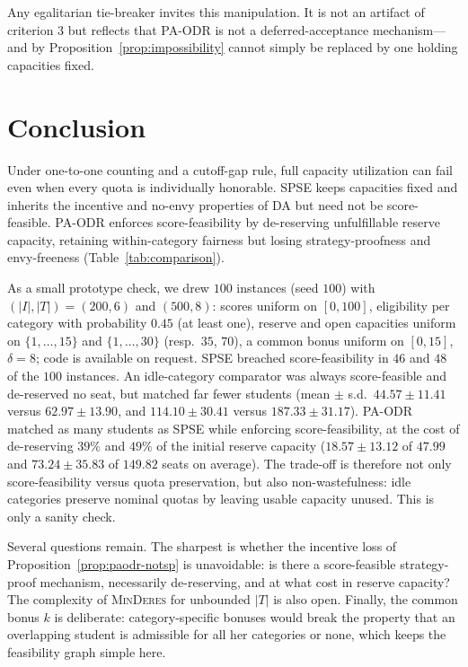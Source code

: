 \documentclass[runningheads]{llncs}
\begin{document}
Any egalitarian tie-breaker invites this manipulation. It is not an artifact of criterion 3 but reflects that PA-ODR is not a deferred-acceptance mechanism---and by Proposition~\ref{prop:impossibility} cannot simply be replaced by one holding capacities fixed.

\section{Conclusion}

Under one-to-one counting and a cutoff-gap rule, full capacity utilization can fail even when every quota is individually honorable. SPSE keeps capacities fixed and inherits the incentive and no-envy properties of DA but need not be score-feasible. PA-ODR enforces score-feasibility by de-reserving unfulfillable reserve capacity, retaining within-category fairness but losing strategy-proofness and envy-freeness (Table~\ref{tab:comparison}).

As a small prototype check, we drew $100$ instances (seed $100$) with $(|I|,|T|)=(200,6)$ and $(500,8)$: scores uniform on $[0,100]$, eligibility per category with probability $0.45$ (at least one), reserve and open capacities uniform on $\{1,\dots,15\}$ and $\{1,\dots,30\}$ (resp.\ $35$, $70$), a common bonus uniform on $[0,15]$, $\delta=8$; code is available on request. SPSE breached score-feasibility in $46$ and $48$ of the $100$ instances. An idle-category comparator was always score-feasible and de-reserved no seat, but matched far fewer students (mean $\pm$ s.d.\ $44.57\pm11.41$ versus $62.97\pm13.90$, and $114.10\pm30.41$ versus $187.33\pm31.17$). PA-ODR matched as many students as SPSE while enforcing score-feasibility, at the cost of de-reserving $39\%$ and $49\%$ of the initial reserve capacity ($18.57\pm13.12$ of $47.99$ and $73.24\pm35.83$ of $149.82$ seats on average). The trade-off is therefore not only score-feasibility versus quota preservation, but also non-wastefulness: idle categories preserve nominal quotas by leaving usable capacity unused. This is only a sanity check.

Several questions remain. The sharpest is whether the incentive loss of Proposition~\ref{prop:paodr-notsp} is unavoidable: is there a score-feasible strategy-proof mechanism, necessarily de-reserving, and at what cost in reserve capacity? The complexity of \textsc{MinDeres} for unbounded $|T|$ is also open. Finally, the common bonus $k$ is deliberate: category-specific bonuses would break the property that an overlapping student is admissible for all her categories or none, which keeps the feasibility graph simple here.
\end{document}
